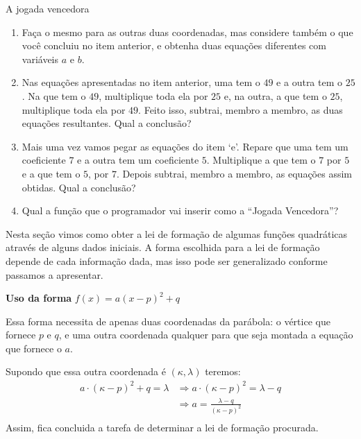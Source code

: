 \begin{task}{A jogada vencedora}
\begin{enumerate}
\item {} 
Faça o mesmo para as outras duas coordenadas, mas considere também o que você concluiu no item anterior, e obtenha duas equações diferentes com variáveis \(a\) e \(b\).

\item {} 
Nas equações apresentadas no item anterior, uma tem o \(49\) e a outra tem o \(25\). Na que tem o \(49\), multiplique toda ela por \(25\) e, na outra, a que tem o \(25\), multiplique toda ela por \(49\). Feito isso, subtrai, membro a membro, as duas equações resultantes. Qual a conclusão?

\item {} 
Mais uma vez vamos pegar as equações do item ‘e’. Repare que uma tem um coeficiente \(7\) e a outra tem um coeficiente \(5\). Multiplique a que tem o \(7\) por \(5\) e a que tem o \(5\), por \(7\). Depois subtrai, membro a membro, as equações assim obtidas. Qual a conclusão?

\item {} 
Qual a função que o programador vai inserir como a “Jogada Vencedora”?

\end{enumerate}
\end{task}


\label{\detokenize{AF209-10:organizando-as-ideias-vantagens-de-cada-forma}}\label{\detokenize{AF209-10::doc}}\label{\detokenize{AF209-10:sec-funcao-quadratica-org-ideias-muv-graf-para-lei}}
Nesta seção vimos como obter a lei de formação de algumas funções quadráticas através de alguns dados iniciais. A forma escolhida para a lei de formação depende de cada informação dada, mas isso pode ser generalizado conforme passamos a apresentar.

\textbf{Uso da forma} \(f(x)=a(x-p)^2+q\)

Essa forma necessita de apenas duas coordenadas da parábola: o vértice que fornece \(p\) e \(q\), e uma outra coordenada qualquer para que seja montada a equação que fornece o \(a\).

Supondo que essa outra coordenada é \((\kappa,\lambda)\) teremos:
\begin{equation*}
\begin{split}a \cdot ( \kappa -p)^2+q= \lambda & \Rightarrow a \cdot ( \kappa -p)^2 = \lambda -q \\
                    & \Rightarrow a = \frac{\lambda -q}{( \kappa -p)^2}\\\end{split}
\end{equation*}
Assim, fica concluida a tarefa de determinar a lei de formação procurada.

